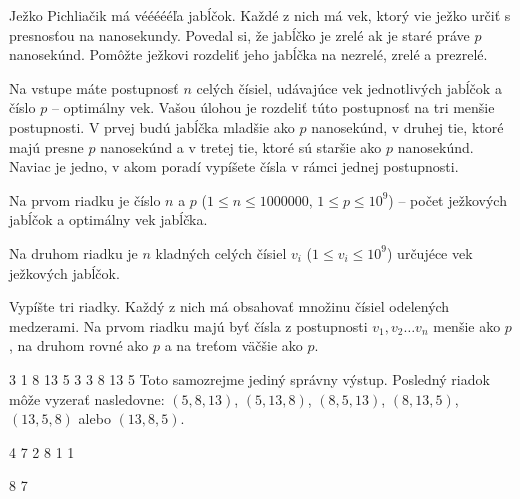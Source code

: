 




Ježko Pichliačik má véééééľa jabĺčok. Každé z nich má vek, ktorý vie ježko určiť s presnosťou na
nanosekundy. Povedal si, že jabĺčko je zrelé ak je staré práve $p$ nanosekúnd. Pomôžte ježkovi
rozdeliť jeho jabĺčka na nezrelé, zrelé a prezrelé.


Na vstupe máte postupnosť $n$ celých čísiel, udávajúce vek jednotlivých jabĺčok a číslo $p$ --
optimálny vek. Vašou úlohou je rozdeliť túto postupnosť na tri menšie postupnosti. V prvej budú
jabĺčka mladšie ako $p$ nanosekúnd, v druhej tie, ktoré majú presne $p$ nanosekúnd a v tretej tie, ktoré sú
staršie ako $p$ nanosekúnd. Naviac je jedno, v akom poradí vypíšete čísla v rámci jednej
postupnosti.


Na prvom riadku je číslo $n$ a $p$ ($1 \leq n \leq 1000000$, $1 \leq p \leq 10^9$) -- počet
ježkových jabĺčok a optimálny vek jabĺčka.

Na druhom riadku je $n$ kladných celých čísiel $v_i$ ($1 \leq v_i \leq 10^9$) určujéce vek ježkových
jabĺčok.


Vypíšte tri riadky. Každý z nich má obsahovať množinu čísiel odelených medzerami. Na prvom riadku
majú byť čísla z postupnosti $v_1, v_2 \dots v_n$ menšie ako $p$, na druhom rovné ako $p$ a na
treťom väčšie ako $p$.


 3
1 8 13 5 3
3
8 13 5
\komentar
Toto samozrejme jediný správny výstup. Posledný riadok môže vyzerať nasledovne: $(5, 8, 13)$, $(5,
13, 8)$, $(8, 5, 13)$, $(8, 13, 5)$, $(13, 5, 8)$ alebo $(13, 8, 5)$. 
\koniec

 4
7 2 8 1
 1

8 7
\koniec


